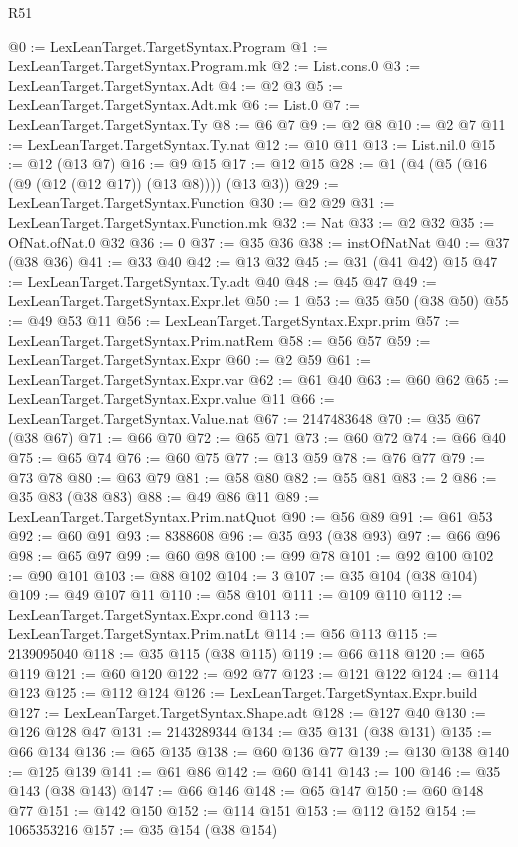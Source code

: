 \begin{lexlean}{R51}
\begin{coremodule}
@0 := LexLeanTarget.TargetSyntax.Program
@1 := LexLeanTarget.TargetSyntax.Program.mk
@2 := List.cons.{0}
@3 := LexLeanTarget.TargetSyntax.Adt
@4 := @2 @3
@5 := LexLeanTarget.TargetSyntax.Adt.mk
@6 := List.{0}
@7 := LexLeanTarget.TargetSyntax.Ty
@8 := @6 @7
@9 := @2 @8
@10 := @2 @7
@11 := LexLeanTarget.TargetSyntax.Ty.nat
@12 := @10 @11
@13 := List.nil.{0}
@15 := @12 (@13 @7)
@16 := @9 @15
@17 := @12 @15
@28 := @1 (@4 (@5 (@16 (@9 (@12 (@12 @17)) (@13 @8)))) (@13 @3))
@29 := LexLeanTarget.TargetSyntax.Function
@30 := @2 @29
@31 := LexLeanTarget.TargetSyntax.Function.mk
@32 := Nat
@33 := @2 @32
@35 := OfNat.ofNat.{0} @32
@36 := 0
@37 := @35 @36
@38 := instOfNatNat
@40 := @37 (@38 @36)
@41 := @33 @40
@42 := @13 @32
@45 := @31 (@41 @42) @15
@47 := LexLeanTarget.TargetSyntax.Ty.adt @40
@48 := @45 @47
@49 := LexLeanTarget.TargetSyntax.Expr.let
@50 := 1
@53 := @35 @50 (@38 @50)
@55 := @49 @53 @11
@56 := LexLeanTarget.TargetSyntax.Expr.prim
@57 := LexLeanTarget.TargetSyntax.Prim.natRem
@58 := @56 @57
@59 := LexLeanTarget.TargetSyntax.Expr
@60 := @2 @59
@61 := LexLeanTarget.TargetSyntax.Expr.var
@62 := @61 @40
@63 := @60 @62
@65 := LexLeanTarget.TargetSyntax.Expr.value @11
@66 := LexLeanTarget.TargetSyntax.Value.nat
@67 := 2147483648
@70 := @35 @67 (@38 @67)
@71 := @66 @70
@72 := @65 @71
@73 := @60 @72
@74 := @66 @40
@75 := @65 @74
@76 := @60 @75
@77 := @13 @59
@78 := @76 @77
@79 := @73 @78
@80 := @63 @79
@81 := @58 @80
@82 := @55 @81
@83 := 2
@86 := @35 @83 (@38 @83)
@88 := @49 @86 @11
@89 := LexLeanTarget.TargetSyntax.Prim.natQuot
@90 := @56 @89
@91 := @61 @53
@92 := @60 @91
@93 := 8388608
@96 := @35 @93 (@38 @93)
@97 := @66 @96
@98 := @65 @97
@99 := @60 @98
@100 := @99 @78
@101 := @92 @100
@102 := @90 @101
@103 := @88 @102
@104 := 3
@107 := @35 @104 (@38 @104)
@109 := @49 @107 @11
@110 := @58 @101
@111 := @109 @110
@112 := LexLeanTarget.TargetSyntax.Expr.cond
@113 := LexLeanTarget.TargetSyntax.Prim.natLt
@114 := @56 @113
@115 := 2139095040
@118 := @35 @115 (@38 @115)
@119 := @66 @118
@120 := @65 @119
@121 := @60 @120
@122 := @92 @77
@123 := @121 @122
@124 := @114 @123
@125 := @112 @124
@126 := LexLeanTarget.TargetSyntax.Expr.build
@127 := LexLeanTarget.TargetSyntax.Shape.adt
@128 := @127 @40
@130 := @126 @128 @47
@131 := 2143289344
@134 := @35 @131 (@38 @131)
@135 := @66 @134
@136 := @65 @135
@138 := @60 @136 @77
@139 := @130 @138
@140 := @125 @139
@141 := @61 @86
@142 := @60 @141
@143 := 100
@146 := @35 @143 (@38 @143)
@147 := @66 @146
@148 := @65 @147
@150 := @60 @148 @77
@151 := @142 @150
@152 := @114 @151
@153 := @112 @152
@154 := 1065353216
@157 := @35 @154 (@38 @154)

\end{coremodule}
\end{lexlean}
